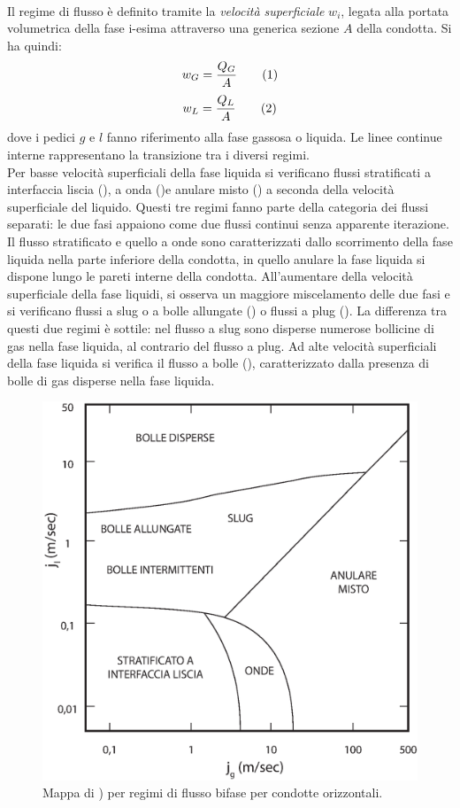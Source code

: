 \paragraph{\textcite{griffith1984multiphase}}
Il regime di flusso è definito tramite la \textit{velocità superficiale} \(w_i\), legata alla portata volumetrica della fase i-esima attraverso una generica sezione \(A\) della condotta. Si ha quindi:
\[w_G = \frac{Q_G}{A} \addtag\]
\[w_L = \frac{Q_L}{A} \addtag\]
dove i pedici \(g\) e \(l\) fanno riferimento alla fase gassosa o liquida. Le linee continue interne rappresentano la transizione tra i diversi regimi.\\
Per basse velocità superficiali della fase liquida si verificano flussi stratificati a interfaccia liscia (), a onda ()e anulare misto () a seconda della velocità superficiale del liquido. Questi tre regimi fanno parte della categoria dei flussi separati: le due fasi appaiono come due flussi continui senza apparente iterazione. Il flusso stratificato e quello a onde sono caratterizzati dallo scorrimento della fase liquida nella parte inferiore della condotta, in quello anulare la fase liquida si dispone lungo le pareti interne della condotta. All'aumentare della velocità superficiale della fase liquidi, si osserva un maggiore miscelamento delle due fasi e si verificano  flussi a slug o a bolle allungate () o flussi a plug (). La differenza tra questi due regimi è sottile: nel flusso a slug sono disperse numerose bollicine di gas nella fase liquida, al contrario del flusso a plug. Ad alte velocità superficiali della fase liquida si verifica il flusso a bolle (), caratterizzato dalla presenza di bolle di gas disperse nella fase liquida.
\begin{figure}[htbp]
    \centering
    \includegraphics[width=.6\textwidth]{fig/fluidodinamica/hor-griffith.eps}
    \caption{Mappa di \textcite{griffith1984multiphase}) per regimi di flusso bifase per condotte orizzontali.}
    \label{fig:hor-griffith}
\end{figure}

